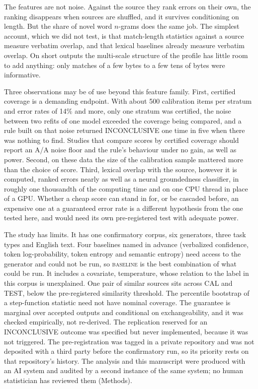\documentclass[11pt]{article}
\newcommand{\arm}[1]{\textsc{#1}}
\begin{document}
The features are not noise. Against the source they rank errors on their own, the ranking disappears when sources are shuffled, and it survives conditioning on length. But the share of novel word $n$-grams does the same job. The simplest account, which we did not test, is that match-length statistics against a source measure verbatim overlap, and that lexical baselines already measure verbatim overlap. On short outputs the multi-scale structure of the profile has little room to add anything: only matches of a few bytes to a few tens of bytes were informative.

Three observations may be of use beyond this feature family. First, certified coverage is a demanding endpoint. With about 500 calibration items per stratum and error rates of 14\% and more, only one stratum was certified, the noise between two refits of one model exceeded the coverage being compared, and a rule built on that noise returned INCONCLUSIVE one time in five when there was nothing to find. Studies that compare scores by certified coverage should report an A/A noise floor and the rule's behaviour under no gain, as well as power. Second, on these data the size of the calibration sample mattered more than the choice of score. Third, lexical overlap with the source, however it is computed, ranked errors nearly as well as a neural groundedness classifier, in roughly one thousandth of the computing time and on one CPU thread in place of a GPU. Whether a cheap score can stand in for, or be cascaded before, an expensive one at a guaranteed error rate is a different hypothesis from the one tested here, and would need its own pre-registered test with adequate power.

The study has limits. It has one confirmatory corpus, six generators, three task types and English text. Four baselines named in advance (verbalized confidence, token log-probability, token entropy and semantic entropy\cite{semanticentropy}) need access to the generator and could not be run, so \arm{baseline} is the best combination of what could be run. It includes a covariate, temperature, whose relation to the label in this corpus is unexplained. One pair of similar sources sits across CAL and TEST, below the pre-registered similarity threshold. The percentile bootstrap of a step-function statistic need not have nominal coverage. The guarantee is marginal over accepted outputs and conditional on exchangeability, and it was checked empirically, not re-derived. The replication reserved for an INCONCLUSIVE outcome was specified but never implemented, because it was not triggered. The pre-registration was tagged in a private repository and was not deposited with a third party before the confirmatory run, so its priority rests on that repository's history. The analysis and this manuscript were produced with an AI system and audited by a second instance of the same system; no human statistician has reviewed them (Methods).
\end{document}
